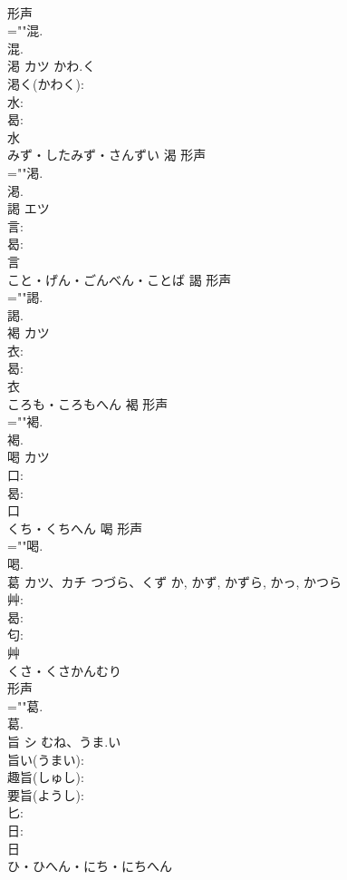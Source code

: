 \documentclass[8pt]{extreport}
\begin{document}
\begin{CJK}{UTF8}{min}
\\	形声 
\\	=""混.
\\	混.
\\	渇	カツ	かわ.く		
\\	渇く(かわく): 
\\	水: 
\\	曷: 
\\	水	
\\	みず・したみず・さんずい	渴	形声 
\\	=""渇.
\\	渇.
\\	謁	エツ			
\\	言: 
\\	曷: 
\\	言	
\\	こと・げん・ごんべん・ことば	謁	形声 
\\	=""謁.
\\	謁.
\\	褐	カツ			
\\	衣: 
\\	曷: 
\\	衣	
\\	ころも・ころもへん	褐	形声 
\\	=""褐.
\\	褐.
\\	喝	カツ			
\\	口: 
\\	曷: 
\\	口	
\\	くち・くちへん	喝	形声 
\\	=""喝.
\\	喝.
\\	葛	カツ、カチ	つづら、くず	か, かず, かずら, かっ, かつら	
\\	艸: 
\\	曷: 
\\	匂: 
\\	艸	
\\	くさ・くさかんむり	
\\	形声 
\\	=""葛.
\\	葛.
\\	旨	シ	むね、うま.い		
\\	旨い(うまい): 
\\	趣旨(しゅし): 
\\	要旨(ようし): 
\\	匕: 
\\	日: 
\\	日	
\\	ひ・ひへん・にち・にちへん	

\end{CJK}
\end{document}
